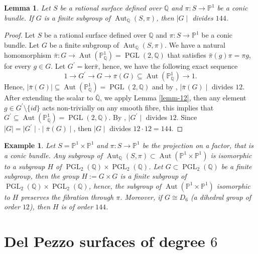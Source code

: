 \documentclass[leqno,12pt]{amsart} %
\newtheorem{lem}[thm]{Lemma}
\newtheorem{ex}[thm]{Example}
\newcommand{\Q}{\ensuremath{\mathbb{Q} }}
\newcommand{\p}{\ensuremath{\mathbb{P} }}
\DeclareMathOperator{\PGL}{PGL}
\DeclareMathOperator{\Aut}{Aut}
\begin{document}
\begin{lem}\label{lemm-24}
 Let $S$ be a rational surface defined over $\Q $ and $\pi:S\rightarrow \p^1$ be a conic bundle. If $G$ is a finite subgroup of $\Aut_{\Q }(S,\pi)$, then $\mid G\mid $ divides $144$. 
\end{lem}
\begin{proof}
    Let $S$ be a rational surface defined over $\Q $ and $\pi:S\rightarrow \p^1$ be a conic bundle. Let $G$ be a finite subgroup of $\Aut_{\Q }(S,\pi)$. We have a natural homomorphism $\bar{\pi} : G\rightarrow \Aut(\p^1_{\Q }) = \PGL (2,\Q )$ that satisfies $\bar{\pi}(g)\pi = \pi g$, for every $g \in G$. Let $G^{\prime} = \mathrm{ker}\bar{\pi} $, hence, we have the following exact sequence
    \begin{equation}
        1\rightarrow G^{\prime}\rightarrow G\rightarrow\bar{\pi}(G)\subseteq\Aut(\p^1_{\Q })\rightarrow1.
    \end{equation}
Hence, $\mid \bar{\pi}(G)\mid \subseteq\Aut(\p^1_{\Q }) = \PGL (2,\Q )$ and by \cite[Theorem 4.2.]{MR2681719}, $\mid \bar{\pi}(G)\mid $ divides $12$. After extending the scalar to $\bar{\Q}$, we apply Lemma \ref{lemm-12}, then any element $g\in G^{\prime}\setminus\{id\}$ acts non-trivially on any smooth fibre, this implies  that $G^{\prime}\subseteq\Aut(\p^1_{\Q})=\PGL (2,\Q)$. By \cite[Theorem 4.2.]{MR2681719}, $\mid G^{\prime}\mid $ divides $12$. Since $\mid G\mid =\mid G^{\prime}\mid \cdot\mid \bar{\pi}(G)\mid $, then $\mid G\mid $  divides $12\cdot12=144$.
\end{proof}

\begin{ex}   \label{ex-05}  
Let $S=\p^1\times\p^1$ and $\pi:S\rightarrow \p^1$ be the projection on a factor, that is a conic bundle. Any subgroup of  $\Aut_{\Q}(S,\pi)\subset \Aut(\p^1\times\p^1)$ is isomorphic to a subgroup $H$ of $\PGL_2(\Q)\times\PGL_2(\Q)$. Let $G\subset\PGL_2(\Q)$  be a finite subgroup, then the group $H:=G\times G$ is a finite subgroup of $\PGL_2(\Q)\times\PGL_2(\Q)$, hence, the subgroup of $\Aut(\p^1\times\p^1)$ isomorphic to $H$ preserves the fibration through $\pi$. Moreover, if  $G\cong D_6$ (a dihedral group of order $12$), then $H$ is of order $144$.  
\end{ex}
\section{\texorpdfstring{Del Pezzo surfaces of degree $6$}{Del Pezzo surfaces of degree 6}}\label{section:6}
 
\end{document}
